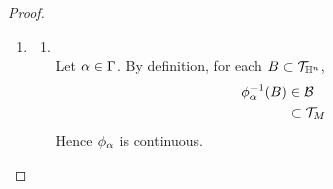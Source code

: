 \documentclass{book}
\begin{document}
\begin{proof}
\begin{enumerate}
\begin{itemize}
\begin{align*}
					& = A_1 \cap A_2
				\end{align*}
				Since $q \in \phi_{\al_1}^{-1}(B_1 \cap [\psi_1 \circ \psi_2^{-1}(B_2)])$ is arbitrary, we have that $\phi_{\al_1}^{-1}(B_1 \cap [\psi_1 \circ \psi_2^{-1}(B_2)]) \subset A_1 \cap A_2$. \\
				Conversely, let  
				\begin{align*}
					q 
					& \in A_1 \cap A_2 \\ 
					& = \phi_{\al_1}^{-1}(B_1) \cap \phi_{\al_2}^{-1}(B_2)
				\end{align*}
				Then $\phi_{\al_1}(q) \in B_1$ and $\phi_{\al_2}(q) \in B_2$. Since $A_1 \cap A_2 \subset U_{\al_1} \cap U_{\al_2}$, we have that 
				\begin{align*}
					\psi_2(q)
					& = \phi_{\al_2}(q) \\
					& \in B_2
				\end{align*}
				which implies that $q \in \psi_2^{-1}(B_2)$. Therefore 
				\begin{align*}
					\phi_{\al_1}(q)
					& = \psi_1(q) \\
					& \in \psi_1 ( \psi_2^{-1}(B_2)) \\
					& =  \psi_1 \circ \psi_2^{-1}(B_2) 
				\end{align*}
				Hence $\phi_{\al_1}(q) \in B_1 \cap [\psi_1 \circ \psi_2^{-1}(B_2)]$. This implies that $q \in \phi_{\al_1}^{-1}( B_1 \cap [\psi_1 \circ \psi_2^{-1}(B_2)])$. Since $q \in A_1 \cap A_2$ is arbitrary, we have that $A_1 \cap A_2 \subset \phi_{\al_1}^{-1}( B_1 \cap [\psi_1 \circ \psi_2^{-1}(B_2)])$. Thus 
				\begin{align*}
					A_1 \cap A_2 
					& = \phi_{\al_1}^{-1}( B_1 \cap [\psi_1 \circ \psi_2^{-1}(B_2)]) \\
					& \in \MB
				\end{align*}
				Thus $\MB$ is a basis for $\MT_M$.
			\end{itemize}
			\item 
			\begin{enumerate}
				\item {}\\
				Let $\alpha \in \Gamma$. By definition, for each $B \subset \mathcal{T}_{\mathbb{H}^n}$, 
				\begin{align*}
					\phi_{\alpha}^{-1}(B) 
					& \in \mathcal{B} \\
					& \subset \mathcal{T}_M
				\end{align*}
				Hence $\phi_{\alpha}$ is continuous. \\

\end{enumerate}
\end{enumerate}
\end{proof}
\end{document}

